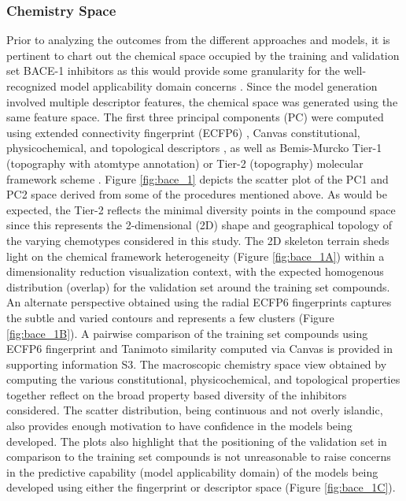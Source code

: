 \subsubsection{Chemistry Space}
Prior to analyzing the outcomes from the different approaches and models, it is pertinent to chart out the chemical space occupied by the training and validation set BACE-1 inhibitors as this would provide some granularity for the well-recognized model applicability domain concerns \cite{sheridan2015relative}.  Since the model generation involved multiple descriptor features, the chemical space was generated using the same feature space.  The first three principal components (PC) were computed using extended connectivity fingerprint (ECFP6) \cite{rogers2010extended}, Canvas constitutional, physicochemical, and topological descriptors \cite{sastry2010large}, as well as Bemis-Murcko Tier-1 (topography with atomtype annotation) or Tier-2 (topography) molecular framework scheme \cite{bemis1996properties}.  Figure \ref{fig:bace_1} depicts the scatter plot of the PC1 and PC2 space derived from some of the procedures mentioned above.  As would be expected, the Tier-2 reflects the minimal diversity points in the compound space since this represents the 2-dimensional (2D) shape and geographical topology of the varying chemotypes considered in this study.  The 2D skeleton terrain sheds light on the chemical framework heterogeneity (Figure \ref{fig:bace_1A}) within a dimensionality reduction visualization context, with the expected homogenous distribution (overlap) for the validation set around the training set compounds.  An alternate perspective obtained using the radial ECFP6 fingerprints captures the subtle and varied contours and represents a few clusters (Figure \ref{fig:bace_1B}).  A pairwise comparison of the training set compounds using ECFP6 fingerprint and Tanimoto similarity computed via Canvas is provided in supporting information S3.  The macroscopic chemistry space view obtained by computing the various constitutional, physicochemical, and topological properties together reflect on the broad property based diversity of the inhibitors considered.  The scatter distribution, being continuous and not overly islandic, also provides enough motivation to have confidence in the models being developed.  The plots also highlight that the positioning of the validation set in comparison to the training set compounds is not unreasonable to raise concerns in the predictive capability (model applicability domain) of the models being developed using either the fingerprint or descriptor space (Figure \ref{fig:bace_1C}).


